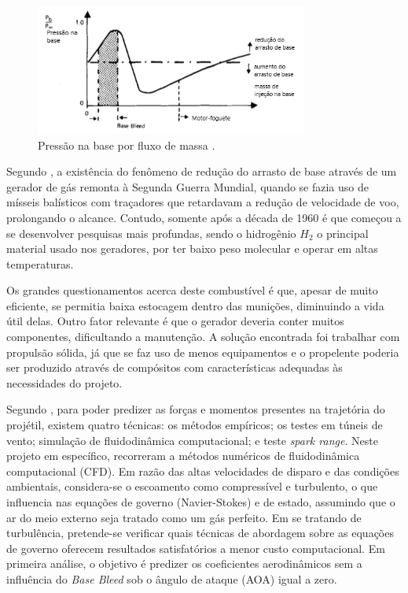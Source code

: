 \begin{figure}[!ht]
	\centering
	\includegraphics[width=0.8\textwidth]{foto04-grafico-andersson1976.png}
	\caption[Pressão na base por fluxo de massa.]{Pressão na base por fluxo de massa \cite{Andersson1976}.}
	\label{fig4:andersson1976}
\end{figure}

Segundo \cite{Jelic2016Aug}, a existência do fenômeno de redução do arrasto de base através de um gerador de gás remonta à Segunda Guerra Mundial, quando se fazia uso de mísseis balísticos com traçadores que retardavam a redução de velocidade de voo, prolongando o alcance. Contudo, somente após a década de 1960 é que começou a se desenvolver pesquisas mais profundas, sendo o hidrogênio \(H_2\) o principal material usado nos geradores, por ter baixo peso molecular e operar em altas temperaturas.

Os grandes questionamentos acerca deste combustível é que, apesar de muito eficiente, se permitia baixa estocagem dentro das munições, diminuindo a vida útil delas. Outro fator relevante é que o gerador deveria conter muitos componentes, dificultando a manutenção. A solução encontrada foi trabalhar com propulsão sólida, já que se faz uso de menos equipamentos e o propelente poderia ser produzido através de compósitos com características adequadas às necessidades do projeto.

Segundo \cite{Mahmoud2009}, para poder predizer as forças e momentos presentes na trajetória do projétil, existem quatro técnicas: os métodos empíricos; os testes em túneis de vento; simulação de fluidodinâmica computacional; e teste \textit{spark range}. Neste projeto em específico, \cite{Mahmoud2009} recorreram a métodos numéricos de fluidodinâmica computacional (CFD). Em razão das altas velocidades de disparo e das condições ambientais, considera-se o escoamento como compressível e turbulento, o que influencia nas equações de governo (Navier-Stokes) e de estado, assumindo que o ar do meio externo seja tratado como um gás perfeito. Em se tratando de turbulência, pretende-se verificar quais técnicas de abordagem sobre as equações de governo oferecem resultados satisfatórios a menor custo computacional. Em primeira análise, o objetivo é predizer os coeficientes aerodinâmicos sem a influência do \textit{Base Bleed} sob o ângulo de ataque (AOA) igual a zero.

